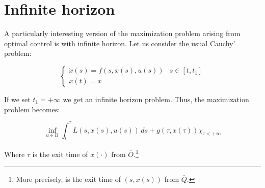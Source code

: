 \section{Infinite horizon}

A particularly interesting version of the maximization problem arising from optimal 
control is with infinite horizon. Let us consider the usual Cauchy' problem:

\begin{equation}
    \begin{cases}
        \dot{x}(s) = f(s,x(s),u(s)) & s\in[t,t_1] \\
        x(t) = x
    \end{cases}
\end{equation}

If we set $t_1=+\infty$ we get an infinite horizon problem. Thus, the maximization 
problem becomes:

\begin{equation}
    \inf_{u\in\mathcal{U}} \int_t^{\tau} L(s,x(s),u(s)) \, ds + g(\tau,x(\tau))\chi_{\tau<+\infty}
\end{equation}

Where $\tau$ is the exit time of $x(\cdot)$ from $\overline{O}$.\footnote{More precisely, is the exit time of $(s,x(s))$ from $\overline{Q}$.}